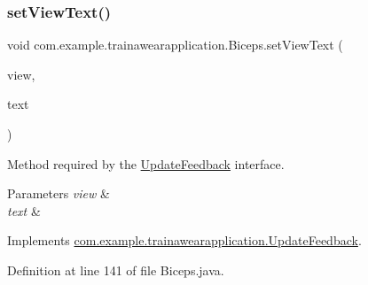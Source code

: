 \mbox{\label{classcom_1_1example_1_1trainawearapplication_1_1_biceps_a6e1ab1b99cd05b29fb7346b0642b7d0e}} 
\subsubsection{\texorpdfstring{setViewText()}{setViewText()}}
{\footnotesize\ttfamily void com.\+example.\+trainawearapplication.\+Biceps.\+set\+View\+Text (\begin{DoxyParamCaption}\item[{Text\+View}]{view,  }\item[{String}]{text }\end{DoxyParamCaption})\hspace{0.3cm}{\ttfamily [inline]}}



Method required by the \mbox{\hyperlink{interfacecom_1_1example_1_1trainawearapplication_1_1_update_feedback}{Update\+Feedback}} interface. 


\begin{DoxyParams}{Parameters}
{\em view} & \\
\hline
{\em text} & \\
\hline
\end{DoxyParams}


Implements \mbox{\hyperlink{interfacecom_1_1example_1_1trainawearapplication_1_1_update_feedback_a7a026880188b11aca6d8184d57e699e8}{com.\+example.\+trainawearapplication.\+Update\+Feedback}}.



Definition at line 141 of file Biceps.\+java.


\begin{DoxyCode}{0}

\end{DoxyCode}
\mbox{\label{classcom_1_1example_1_1trainawearapplication_1_1_biceps_ad9e0fdf8309b31736b338a3b29079b24}} 
